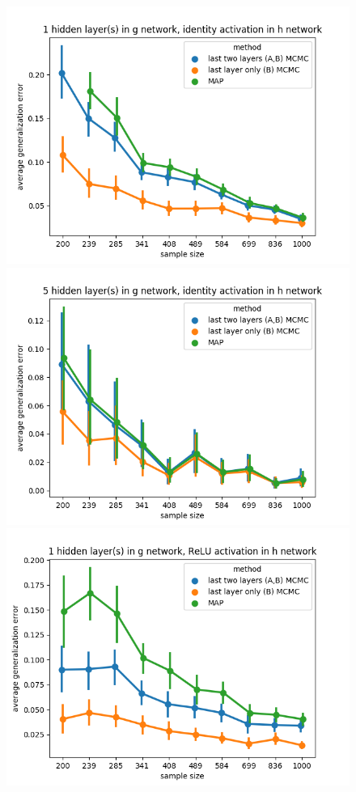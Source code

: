 \documentclass{article} %
\begin{document}
\begin{figure}[h]
	\begin{center}
		\includegraphics[scale=0.4]{taskid12.png}
		\includegraphics[scale=0.4]{taskid13.png}
		\includegraphics[scale=0.4]{taskid14.png}

\end{center}
\end{figure}
\end{document}
